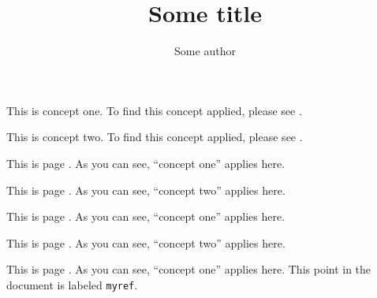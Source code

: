 \documentclass{article}
\begin{document}
\title{Some title}

\author{Some author}

\maketitle

This is concept one. To find this concept applied, please
see .

This is concept two. To find this concept applied, please
see .

\newpage

This is page \thepage. As you can see, ``concept
one'' applies here.\newpage

This is page \thepage. As you can see,
``concept two'' applies here.\newpage

This is page \thepage. As you can see, ``concept
one'' applies here.\newpage

This is page \thepage. As you can see,
``concept two'' applies here.\newpage

This is page \thepage. As you can
see, ``concept one'' applies here. This point in the document is
labeled \texttt{myref}.
\end{document}
